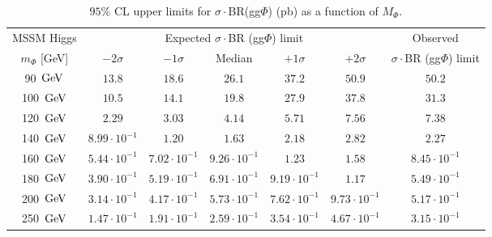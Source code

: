\begin{table}[!h]
  \begin{center}
    \caption{$95\%$ CL upper limits for $\sigma\cdot$BR(gg$\Phi$) (pb) as a function of $M_{\Phi}$.}
{\small
\begin{tabular}{|c|c|c|c|c|c|c|}
\cline{2-7}
\multicolumn{1}{c}{MSSM Higgs}      & \multicolumn{5}{|c|}{Expected $\sigma\cdot$BR (gg$\Phi$) limit} & Observed \\
\cline{1-6}
  $m_{\Phi}$ [GeV] &$-2\sigma$  &   $-1\sigma$ &        Median &    $+1\sigma$ &  $+2\sigma$ & $\sigma\cdot$BR (gg$\Phi$) limit \\
\hline
                90~$\mathrm{GeV}$ &               $13.8$ &               $18.6$ &               $26.1$ &               $37.2$ &               $50.9$ &               $50.2$  \\
\hline
               100~$\mathrm{GeV}$ &               $10.5$ &               $14.1$ &               $19.8$ &               $27.9$ &               $37.8$ &               $31.3$  \\
\hline
               120~$\mathrm{GeV}$ &               $2.29$ &               $3.03$ &               $4.14$ &               $5.71$ &               $7.56$ &               $7.38$  \\
\hline
               140~$\mathrm{GeV}$ &               $8.99 \cdot 10^{-1}$ &               $1.20$ &               $1.63$ &               $2.18$ &               $2.82$ &               $2.27$  \\
\hline
               160~$\mathrm{GeV}$ &               $5.44 \cdot 10^{-1}$ &               $7.02 \cdot 10^{-1}$ &               $9.26 \cdot 10^{-1}$ &               $1.23$ &               $1.58$ &               $8.45 \cdot 10^{-1}$  \\
\hline
               180~$\mathrm{GeV}$ &               $3.90 \cdot 10^{-1}$ &               $5.19 \cdot 10^{-1}$ &               $6.91 \cdot 10^{-1}$ &               $9.19 \cdot 10^{-1}$ &               $1.17$ &               $5.49 \cdot 10^{-1}$  \\
\hline
               200~$\mathrm{GeV}$ &               $3.14 \cdot 10^{-1}$ &               $4.17 \cdot 10^{-1}$ &               $5.73 \cdot 10^{-1}$ &               $7.62 \cdot 10^{-1}$ &               $9.73 \cdot 10^{-1}$ &               $5.17 \cdot 10^{-1}$  \\
\hline
               250~$\mathrm{GeV}$ &               $1.47 \cdot 10^{-1}$ &               $1.91 \cdot 10^{-1}$ &               $2.59 \cdot 10^{-1}$ &               $3.54 \cdot 10^{-1}$ &               $4.67 \cdot 10^{-1}$ &               $3.15 \cdot 10^{-1}$  \\

\end{tabular}}
\end{center}
\end{table}
